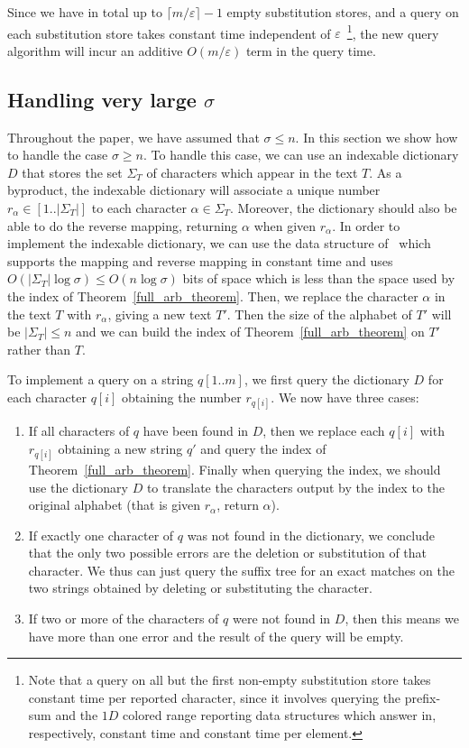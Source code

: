 \documentclass{article}
\newcommand{\?}{\mskip1.5mu}
\renewcommand{\epsilon}{\varepsilon}
\begin{document}
Since we have in total up to $\lceil m/\epsilon\rceil-1$ empty substitution stores, and a query on each substitution store takes constant time independent of $\epsilon$~\footnote{Note that a query on all but the first non-empty substitution store takes constant time per reported character, since it involves querying the prefix-sum and the $1D$ colored range reporting data structures which answer in, respectively, constant time and constant time per element.}, the new query algorithm will incur an additive $O(m/\epsilon)$ term in the query time. 

\subsection{Handling very large $\sigma$}
Throughout the paper, we have assumed that $\sigma\leq n$. In this section we show how to handle the case $\sigma\geq n$. To handle this case, we can use an indexable dictionary $D$ that stores the set $\Sigma_T$ of characters which appear in the text $T$. As a byproduct, the indexable dictionary will associate a unique number $r_\alpha\in[1..|\Sigma_T|]$ to each character $\alpha\in \Sigma_T$. Moreover, the dictionary should also be able to do the reverse mapping, returning $\alpha$ when given $r_\alpha$. 
In order to implement the indexable dictionary, we can use the data structure of~\cite{RRS07} which supports the mapping and reverse mapping in constant time and uses $O(|\Sigma_T|\log\sigma)\leq O(n\log\sigma)$ bits of space which is less than the space used by the index of Theorem~\ref{full_arb_theorem}. 
Then, we replace the character $\alpha$ in the text $T$ with $r_\alpha$, giving a new text $T'$. Then the size of the alphabet of $T'$ will be $|\Sigma_T|\leq n$ and we can build the index of Theorem~\ref{full_arb_theorem} on $T'$ rather than $T$. 

To implement a query on a string $q[1..m]$, we first query the dictionary $D$ for each character $q[i]$ obtaining the number $r_{q[i]}$. We now have three cases:
\begin{enumerate}
\item If all characters of $q$ have been found in $D$, then we replace each $q[i]$ with $r_{q[i]}$ obtaining a new string $q'$ and query the index of Theorem~\ref{full_arb_theorem}. 
Finally when querying the index, we should use the dictionary $D$ to translate the characters output by the index to the original alphabet (that is given $r_\alpha$, return $\alpha$). 
\item If exactly one character of $q$ was not found in the dictionary, we conclude that the only two possible errors are the deletion or substitution of that character. We thus can just query the suffix tree for an exact matches on the two strings obtained by deleting or substituting the character. 
\item If two or more of the characters of $q$ were not found in $D$, then this means we have more than one error and the result of the query will be empty. 
\end{enumerate}
\end{document}
